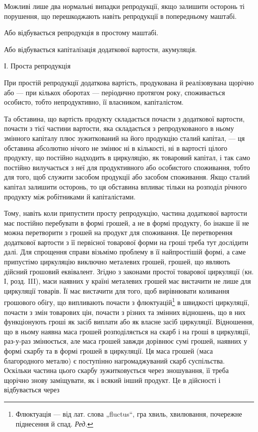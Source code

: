 Можливі лише два нормальні випадки репродукції, якщо залишити
осторонь ті порушення, що перешкоджають навіть репродукції в попередньому
маштабі.

Або відбувається репродукція в простому маштабі.

Або відбувається капіталізація додаткової вартости, акумуляція.

І. Проста репродукція

При простій репродукції додаткова вартість, продукована й реалізовувана
щорічно або — при кількох оборотах — періодично протягом року,
споживається особисто, тобто непродуктивно, її власником, капіталістом.

Та обставина, що вартість продукту складається почасти з додаткової
вартости, почасти з тієї частини вартости, яка складається з репродукованого
в ньому змінного капіталу плюс зужиткований на його продукцію
сталий капітал, — ця обставина абсолютно нічого не змінює ні в кількості,
ні в вартості цілого продукту, що постійно надходить в циркуляцію, як
товаровий капітал, і так само постійно вилучається з неї для продуктивного
або особистого споживання, тобто для того, щоб служити засобом
продукції або засобом споживання. Якщо сталий капітал залишити осторонь,
то ця обставина впливає тільки на розподіл річного продукту між
робітниками й капіталістами.

Тому, навіть коли припустити просту репродукцію, частина додаткової
вартости має постійно перебувати в формі грошей, а не в формі
продукту, бо інакше її не можна перетворити з грошей на продукт для
споживання. Це перетворення додаткової вартости з її первісної товарової
форми на гроші треба тут дослідити далі. Для спрощення справи
візьмімо проблему в її найпростішій формі, а саме припустімо циркуляцію
виключно металевих грошей, грошей, що являють дійсний грошовий еквівалент.
Згідно з законами простої товарової циркуляції (кн. І, розд. III), маси
наявних у країні металевих грошей має вистачити не лише для
циркуляції товарів. Її має вистачити для того, щоб вирівнювати коливання
грошового обігу, що випливають почасти з флюктуацій\footnote*{
Флюктуація — від лат. слова „fluctus“, гра хвиль, хвилювання, почережне
піднесення й спад. \emph{Ред.}
} в швидкості
циркуляції, почасти з змін товарових цін, почасти з різних та
змінних відношень, що в них функціонують гроші як засіб виплати або
як власне засіб циркуляції. Відношення, що в ньому наявна маса грошей
розподіляється на скарб і на гроші в циркуляції, раз-у-раз змінюється, але
маса грошей завжди дорівнює сумі грошей, наявних у формі скарбу та
в формі грошей в циркуляції. Ця маса грошей (маса благородного металю)
є поступінно нагромаджуваний скарб суспільства. Оскільки частина цього
скарбу зужитковується через зношування, її треба щорічно знову заміщувати,
як і всякий інший продукт. Це в дійсності і відбувається через
\parbreak{}  %
